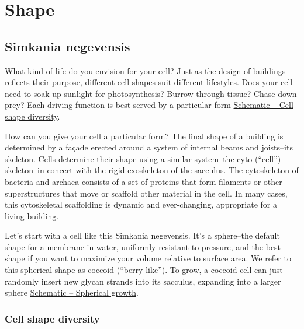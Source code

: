 \documentclass[]{tufte-book}
\begin{document}
\chapter{Shape}\label{shape}

\section{Simkania negevensis}\label{simkania-negevensis}

What kind of life do you envision for your cell? Just as the design of
buildings reflects their purpose, different cell shapes suit different
lifestyles. Does your cell need to soak up sunlight for photosynthesis?
Burrow through tissue? Chase down prey? Each driving function is best
served by a particular form
\protect\hyperlink{Cell_shape_diversity}{Schematic -- Cell shape
diversity}.

How can you give your cell a particular form? The final shape of a
building is determined by a façade erected around a system of internal
beams and joists--its skeleton. Cells determine their shape using a
similar system--the cyto-(``cell'') skeleton--in concert with the rigid
exoskeleton of the sacculus. The cytoskeleton of bacteria and archaea
consists of a set of proteins that form filaments or other
superstructures that move or scaffold other material in the cell. In
many cases, this cytoskeletal scaffolding is dynamic and ever-changing,
appropriate for a living building.

Let's start with a cell like this Simkania negevensis. It's a
sphere--the default shape for a membrane in water, uniformly resistant
to pressure, and the best shape if you want to maximize your volume
relative to surface area. We refer to this spherical shape as coccoid
(``berry-like''). To grow, a coccoid cell can just randomly insert new
glycan strands into its sacculus, expanding into a larger sphere
\protect\hyperlink{Spherical_growth}{Schematic -- Spherical growth}.

\hypertarget{Cell_shape_diversity}{\subsection{Cell shape
diversity}\label{Cell_shape_diversity}}
\end{document}
